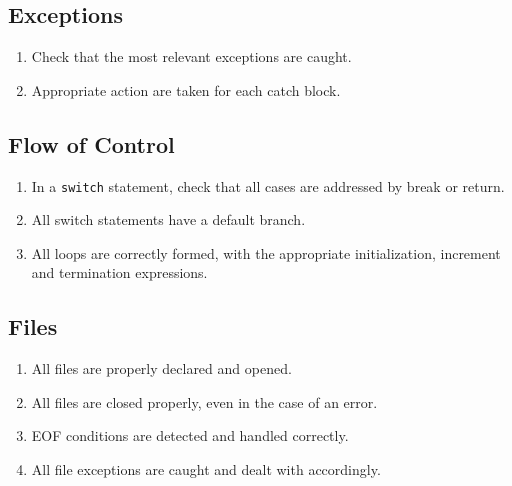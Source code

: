 \documentclass{article}
\begin{document}
\subsection*{Exceptions}\begin{enumerate}[resume]
\item Check that the most relevant exceptions are caught.
\item Appropriate action are taken for each catch block.
\end{enumerate}

\subsection*{Flow of Control}\begin{enumerate}[resume]
\item In a \texttt{switch} statement, check that all cases are addressed by break or return.
\item All switch statements have a default branch.
\item All loops are correctly formed, with the appropriate initialization, increment and termination expressions.
\end{enumerate}

\subsection*{Files}\begin{enumerate}[resume]
\item All files are properly declared and opened.
\item All files are closed properly, even in the case of an error.
\item EOF conditions are detected and handled correctly.
\item All file exceptions are caught and dealt with accordingly.
\end{enumerate}
\end{document}
